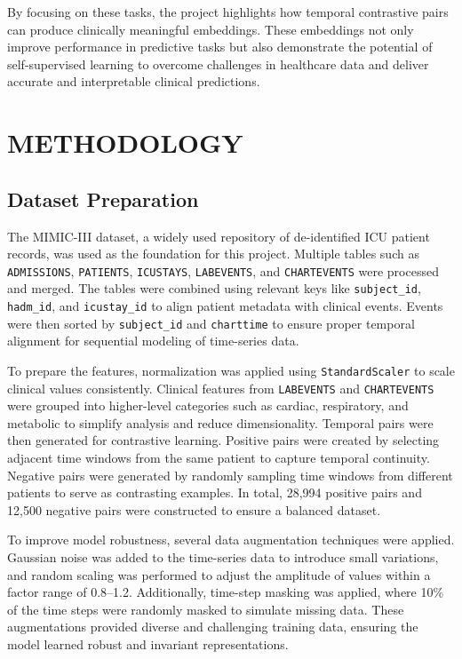 \documentclass[twocolumn]{article}
\begin{document}
    By focusing on these tasks, the project highlights how temporal contrastive
    pairs can produce clinically meaningful embeddings. These embeddings not only
    improve performance in predictive tasks but also demonstrate the potential of
    self-supervised learning to overcome challenges in healthcare data and deliver
    accurate and interpretable clinical predictions.

    \section{ \large METHODOLOGY}

    \subsection{Dataset Preparation}
    The MIMIC-III dataset, a widely used repository of de-identified ICU patient
    records, was used as the foundation for this project. Multiple tables such as
    \texttt{ADMISSIONS}, \texttt{PATIENTS}, \texttt{ICUSTAYS}, \texttt{LABEVENTS},
    and \texttt{CHARTEVENTS} were processed and merged. The tables were combined
    using relevant keys like \texttt{subject\_id}, \texttt{hadm\_id}, and \texttt{icustay\_id}
    to align patient metadata with clinical events. Events were then sorted by \texttt{subject\_id}
    and \texttt{charttime} to ensure proper temporal alignment for sequential modeling
    of time-series data.

    To prepare the features, normalization was applied using \texttt{StandardScaler}
    to scale clinical values consistently. Clinical features from \texttt{LABEVENTS}
    and \texttt{CHARTEVENTS} were grouped into higher-level categories such as
    cardiac, respiratory, and metabolic to simplify analysis and reduce
    dimensionality. Temporal pairs were then generated for contrastive learning.
    Positive pairs were created by selecting adjacent time windows from the same
    patient to capture temporal continuity. Negative pairs were generated by randomly
    sampling time windows from different patients to serve as contrasting examples.
    In total, 28,994 positive pairs and 12,500 negative pairs were constructed to
    ensure a balanced dataset.

    To improve model robustness, several data augmentation techniques were
    applied. Gaussian noise was added to the time-series data to introduce small
    variations, and random scaling was performed to adjust the amplitude of
    values within a factor range of 0.8--1.2. Additionally, time-step masking was
    applied, where 10\% of the time steps were randomly masked to simulate missing
    data. These augmentations provided diverse and challenging training data, ensuring
    the model learned robust and invariant representations.
\end{document}
